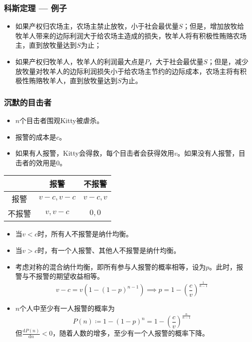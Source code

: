 \documentclass[UTF8,11pt,colorlinks,compress,openany]{beamer}%
\begin{document}
\begin{frame}\frametitle{科斯定理 --- 例子}
\begin{center}
\end{center}
\begin{itemize}
	\item 如果产权归农场主，农场主禁止放牧，小于社会最优量$S$；但是，增加放牧给牧羊人带来的边际利润大于给农场主造成的损失，牧羊人将有积极性贿赂农场主，直到放牧量达到$S$为止；
	\item 如果产权归牧羊人，牧羊人的利润最大点是$P$，大于社会最优量$S$；但是，减少放牧量对牧羊人的边际利润损失小于给农场主节约的边际成本，农场主将有积极性贿赂牧羊人，直到放牧量达到$S$为止。
\end{itemize}
\end{frame}

\begin{frame}\frametitle{沉默的目击者}
\setlength\abovedisplayskip{0pt}
\setlength\belowdisplayskip{0pt}
\begin{itemize}
	\item $n$个目击者围观Kitty被虐杀。
	\item 报警的成本是$c$。
	\item 如果有人报警，Kitty会得救，每个目击者会获得效用$v$。如果没有人报警，目击者的效用是$0$。
\end{itemize}
\begin{table}
\begin{tabu}{c|c|c}
\hline
	& 报警 & 不报警 \\
\hline
报警 & $v-c,v-c$ & $v-c,v$ \\
不报警 & $v,v-c$ & $0,0$ \\
\hline
\end{tabu}
\end{table}
\begin{itemize}
	\item 当$v<c$时，所有人不报警是纳什均衡。
	\item 当$v>c$时，有一个人报警、其他人不报警是纳什均衡。
	\item 考虑对称的混合纳什均衡，即所有参与⼈报警的概率相等，设为$p$。此时，报警与不报警的期望收益相等。
	\[v-c=v(1-(1-p)^{n-1})\implies p=1-\left(\frac{c}{v}\right)^\frac{1}{n-1}\]
	\item $n$个人中至少有一人报警的概率为
	\[P(n)\coloneqq 1-(1-p)^n=1-\left(\frac{c}{v}\right)^\frac{n}{n-1}\]
	但$\frac{\mathrm{d}P(n)}{\mathrm{d}n}<0$，随着人数的增多，至少有一个人报警的概率下降。
\end{itemize}
\end{frame}
\end{document}
